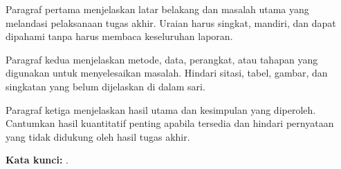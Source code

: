 

Paragraf pertama menjelaskan latar belakang dan masalah utama yang melandasi pelaksanaan tugas akhir. Uraian harus singkat, mandiri, dan dapat dipahami tanpa harus membaca keseluruhan laporan.

Paragraf kedua menjelaskan metode, data, perangkat, atau tahapan yang digunakan untuk menyelesaikan masalah. Hindari sitasi, tabel, gambar, dan singkatan yang belum dijelaskan di dalam sari.

Paragraf ketiga menjelaskan hasil utama dan kesimpulan yang diperoleh. Cantumkan hasil kuantitatif penting apabila tersedia dan hindari pernyataan yang tidak didukung oleh hasil tugas akhir.

\vspace{6mm}
\noindent\textbf{Kata kunci:} \kataKunci.
